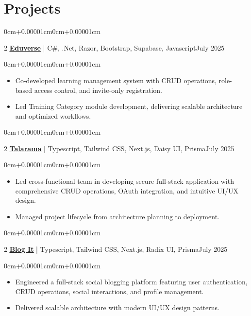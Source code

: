 \documentclass[10pt, letterpaper]{article}
\newenvironment{highlights}{\begin{itemize}[topsep=0.10cm,parsep=0.10cm,partopsep=0pt,itemsep=0pt,leftmargin=0cm+10pt]}{\end{itemize}}
\newenvironment{onecolentry}{\begin{adjustwidth}{0cm+0.00001cm}{0cm+0.00001cm}}{\end{adjustwidth}}
\newenvironment{twocolentry}[2][]{\onecolentry\def\secondColumn{#2}\setcolumnwidth{\fill,5cm}\begin{paracol}{2}}{\switchcolumn \raggedleft \secondColumn\end{paracol}\endonecolentry}
\begin{document}
\section{Projects}
    \begin{twocolentry}{July 2025}
        \textbf{\underline{\href{https://github.com/jlescarlan11/Eduverse}{Eduverse}}} | C\#, .Net, Razor, Bootstrap, Supabase, Javascript\end{twocolentry}
    \vspace{0.10cm}
    \begin{onecolentry}
        \begin{highlights}
            \item Co-developed learning management system with CRUD operations, role-based access control, and invite-only registration.
            \item Led Training Category module development, delivering scalable architecture and optimized workflows.
        \end{highlights}
    \end{onecolentry}
    \vspace{0.15cm}
    \begin{twocolentry}{July 2025}
        \textbf{\underline{\href{https://talarama.vercel.app/}{Talarama}}} | Typescript, Tailwind CSS, Next.js, Daisy UI, Prisma\end{twocolentry}
    \vspace{0.10cm}
    \begin{onecolentry}
        \begin{highlights}
            \item Led cross-functional team in developing secure full-stack application with comprehensive CRUD operations, OAuth integration, and intuitive UI/UX design.
            \item Managed project lifecycle from architecture planning to deployment.
        \end{highlights}
    \end{onecolentry}
    \vspace{0.15cm}
    \begin{twocolentry}{July 2025}
        \textbf{\underline{\href{https://blog-it-gamma.vercel.app/}{Blog It}}} | Typescript, Tailwind CSS, Next.js, Radix UI, Prisma\end{twocolentry}
    \vspace{0.10cm}
    \begin{onecolentry}
        \begin{highlights}
            \item Engineered a full-stack social blogging platform featuring user authentication, CRUD operations, social interactions, and profile management.
            \item Delivered scalable architecture with modern UI/UX design patterns.
        \end{highlights}
    \end{onecolentry}
\end{document}
